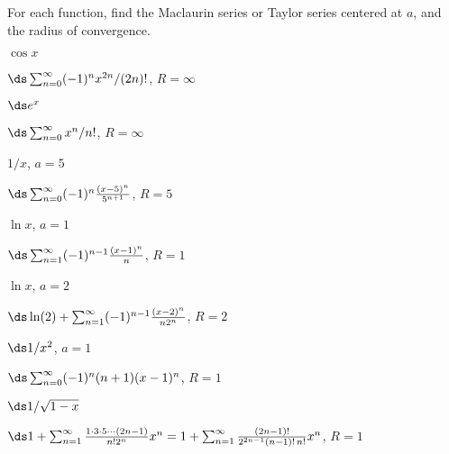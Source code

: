 \begin{exercises}

For each function, find the Maclaurin series or Taylor series centered
at $a$, and the radius of convergence.

\begin{exercise} $\cos x$
\begin{answer} $\ds\sum_{n=0}^\infty (-1)^n x^{2n}/(2n)!$, $R=\infty$
\end{answer}\end{exercise}

\begin{exercise} $\ds e^x$
\begin{answer} $\ds\sum_{n=0}^\infty x^n/n!$, $R=\infty$
\end{answer}\end{exercise}

\begin{exercise} $1/x$, $a=5$
\begin{answer} $\ds\sum_{n=0}^\infty (-1)^n{(x-5)^n\over 5^{n+1}}$, $R=5$
\end{answer}\end{exercise}

\begin{exercise} $\ln x$, $a=1$
\begin{answer} $\ds\sum_{n=1}^\infty (-1)^{n-1}{(x-1)^n\over n}$, $R=1$
\end{answer}\end{exercise}

\begin{exercise} $\ln x$, $a=2$
\begin{answer} $\ds\ln(2)+\sum_{n=1}^\infty (-1)^{n-1}{(x-2)^n\over n 2^n}$, $R=2$
\end{answer}\end{exercise}

\begin{exercise} $\ds 1/x^2$, $a=1$
\begin{answer} $\ds\sum_{n=0}^\infty (-1)^n(n+1)(x-1)^n$, $R=1$
\end{answer}\end{exercise}

\begin{exercise} $\ds 1/\sqrt{1-x}$
\begin{answer} $\ds1+\sum_{n=1}^\infty {1\cdot3\cdot5\cdots(2n-1)\over
n!2^n} x^n=1+\sum_{n=1}^\infty {(2n-1)!\over 2^{2n-1}(n-1)!\,n!}x^n$, $R=1$
\end{answer}\end{exercise}


\end{exercises}
